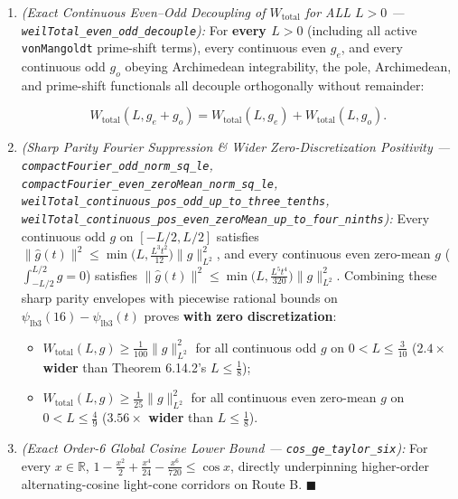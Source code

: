 \documentclass[
  11pt,
]{article}
\providecommand{\tightlist}{%
  \setlength{\itemsep}{0pt}\setlength{\parskip}{0pt}}
\begin{document}
\begin{enumerate}
\def\labelenumi{\arabic{enumi}.}
\item
  \emph{(Exact Continuous Even--Odd Decoupling of \(W_{\text{total}}\)
  for ALL \(L > 0\) --- \texttt{weilTotal\_even\_odd\_decouple}):} For
  \textbf{every \(L > 0\)} (including all active \texttt{vonMangoldt}
  prime-shift terms), every continuous even \(g_e\), and every
  continuous odd \(g_o\) obeying Archimedean integrability, the pole,
  Archimedean, and prime-shift functionals all decouple orthogonally
  without remainder:

  \[W_{\text{total}}(L, g_e + g_o) = W_{\text{total}}(L, g_e) + W_{\text{total}}(L, g_o).\]
\item
  \emph{(Sharp Parity Fourier Suppression \& Wider Zero-Discretization
  Positivity --- \texttt{compactFourier\_odd\_norm\_sq\_le},
  \texttt{compactFourier\_even\_zeroMean\_norm\_sq\_le},
  \texttt{weilTotal\_continuous\_pos\_odd\_up\_to\_three\_tenths},
  \texttt{weilTotal\_continuous\_pos\_even\_zeroMean\_up\_to\_four\_ninths}):}
  Every continuous odd \(g\) on \([-L/2, L/2]\) satisfies
  \(\|\widehat{g}(t)\|^2 \le \min\big(L, \frac{L^3 t^2}{12}\big)\|g\|_{L^2}^2\),
  and every continuous even zero-mean \(g\)
  (\(\int_{-L/2}^{L/2} g = 0\)) satisfies
  \(\|\widehat{g}(t)\|^2 \le \min\big(L, \frac{L^5 t^4}{320}\big)\|g\|_{L^2}^2\).
  Combining these sharp parity envelopes with piecewise rational bounds
  on \(\psi_{\text{lb}3}(16) - \psi_{\text{lb}3}(t)\) proves
  \textbf{with zero discretization}:

  \begin{itemize}
  \tightlist
  \item
    \(W_{\text{total}}(L, g) \ge \frac{1}{100}\|g\|_{L^2}^2\) for all
    continuous odd \(g\) on \(0 < L \le \frac{3}{10}\)
    (\textbf{\(2.4\times\) wider} than Theorem 6.14.2's
    \(L \le \frac{1}{8}\));
  \item
    \(W_{\text{total}}(L, g) \ge \frac{1}{25}\|g\|_{L^2}^2\) for all
    continuous even zero-mean \(g\) on \(0 < L \le \frac{4}{9}\)
    (\textbf{\(3.56\times\) wider} than \(L \le \frac{1}{8}\)).
  \end{itemize}
\item
  \emph{(Exact Order-6 Global Cosine Lower Bound ---
  \texttt{cos\_ge\_taylor\_six}):} For every \(x \in \mathbb{R}\),
  \(1 - \frac{x^2}{2} + \frac{x^4}{24} - \frac{x^6}{720} \le \cos x\),
  directly underpinning higher-order alternating-cosine light-cone
  corridors on Route B. \(\blacksquare\)
\end{enumerate}
\end{document}
